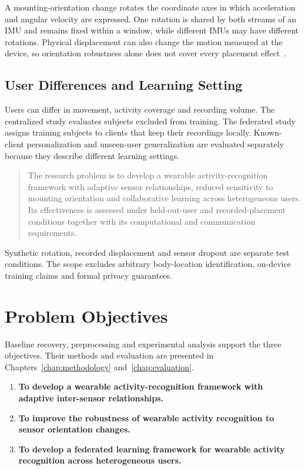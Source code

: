 \documentclass[10pt,a4paper,oneside,openany]{report}
\begin{document}
A mounting-orientation change rotates the coordinate axes in which acceleration and angular velocity are expressed. One rotation is shared by both streams of an IMU and remains fixed within a window, while different IMUs may have different rotations. Physical displacement can also change the motion measured at the device, so orientation robustness alone does not cover every placement effect~\cite{banos}.

\subsection{User Differences and Learning Setting}

Users can differ in movement, activity coverage and recording volume. The centralized study evaluates subjects excluded from training. The federated study assigns training subjects to clients that keep their recordings locally. Known-client personalization and unseen-user generalization are evaluated separately because they describe different learning settings.

\begin{quote}
The research problem is to develop a wearable activity-recognition framework with adaptive sensor relationships, reduced sensitivity to mounting orientation and collaborative learning across heterogeneous users. Its effectiveness is assessed under held-out-user and recorded-placement conditions together with its computational and communication requirements.
\end{quote}

Synthetic rotation, recorded displacement and sensor dropout are separate test conditions. The scope excludes arbitrary body-location identification, on-device training claims and formal privacy guarantees.

\section{Problem Objectives}

Baseline recovery, preprocessing and experimental analysis support the three objectives. Their methods and evaluation are presented in Chapters~\ref{chap:methodology} and~\ref{chap:evaluation}.

\begin{enumerate}[label=\textbf{Objective~\arabic*.}]
\item \textbf{To develop a wearable activity-recognition framework with adaptive inter-sensor relationships.}
\item \textbf{To improve the robustness of wearable activity recognition to sensor orientation changes.}
\item \textbf{To develop a federated learning framework for wearable activity recognition across heterogeneous users.}
\end{enumerate}
\end{document}
